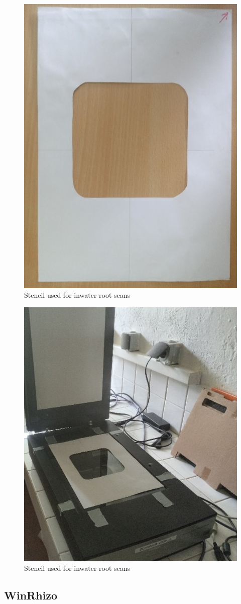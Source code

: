\documentclass[
  12pt,
  american,
  a4paper,
  extrafontsizes,onecolumn,openright
  ]{memoir}
\begin{document}
\begin{figure}

{\centering \includegraphics[width=0.5\linewidth]{document/trait/rootmorpho/squre_stencil} 

}

\caption{Stencil used for inwater root scans}\label{fig:scanstencil-1}
\end{figure}
\begin{figure}

{\centering \includegraphics[width=0.5\linewidth]{document/trait/rootmorpho/squre_stencil2} 

}

\caption{Stencil used for inwater root scans}\label{fig:scanstencil-2}
\end{figure}

\normalsize

\hypertarget{winrhizo}{%
\subsection{WinRhizo}\label{winrhizo}}
\end{document}
